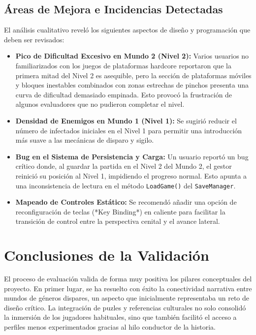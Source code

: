 \subsection{Áreas de Mejora e Incidencias Detectadas}
El análisis cualitativo reveló los siguientes aspectos de diseño y programación que deben ser revisados:
\begin{itemize}
    \item \textbf{Pico de Dificultad Excesivo en Mundo 2 (Nivel 2):} Varios usuarios no familiarizados con los juegos de plataformas hardcore reportaron que la primera mitad del Nivel 2 es asequible, pero la sección de plataformas móviles y bloques inestables combinados con zonas estrechas de pinchos presenta una curva de dificultad demasiado empinada. Esto provocó la frustración de algunos evaluadores que no pudieron completar el nivel.
    \item \textbf{Densidad de Enemigos en Mundo 1 (Nivel 1):} Se sugirió reducir el número de infectados iniciales en el Nivel 1 para permitir una introducción más suave a las mecánicas de disparo y sigilo.
    \item \textbf{Bug en el Sistema de Persistencia y Carga:} Un usuario reportó un bug crítico donde, al guardar la partida en el Nivel 2 del Mundo 2, el gestor reinició su posición al Nivel 1, impidiendo el progreso normal. Esto apunta a una inconsistencia de lectura en el método \texttt{LoadGame()} del \texttt{SaveManager}.
    \item \textbf{Mapeado de Controles Estático:} Se recomendó añadir una opción de reconfiguración de teclas (*Key Binding*) en caliente para facilitar la transición de control entre la perspectiva cenital y el avance lateral.
\end{itemize}

\section{Conclusiones de la Validación}
El proceso de evaluación valida de forma muy positiva los pilares conceptuales del proyecto. En primer lugar, se ha resuelto con éxito la conectividad narrativa entre mundos de géneros dispares, un aspecto que inicialmente representaba un reto de diseño crítico. La integración de puzles y referencias culturales no solo consolidó la inmersión de los jugadores habituales, sino que también facilitó el acceso a perfiles menos experimentados gracias al hilo conductor de la historia.

